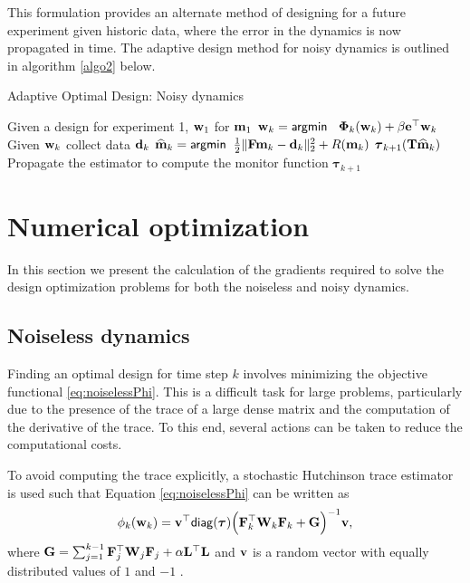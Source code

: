 \documentclass[english]{siamltex}
\newcommand{\bfF}	{{\bf{F}}}
\newcommand{\bfG}	{{\bf{G}}}
\newcommand{\bfL}	{{\bf{L}}}
\newcommand{\bfQ}	{{\bf{Q}}}
\newcommand{\bfT}	{{\bf{T}}}
\newcommand{\bfW}	{{\bf{W}}}
\newcommand{\bfd}	{{\bf{d}}}
\newcommand{\bfe}	{{\bf{e}}}
\newcommand{\bfm}	{{\bf{m}}}
\newcommand{\bfv}	{{\bf{v}}}
\newcommand{\bfw}	{{\bf{w}}}
\newcommand{\hf}        {{\frac 12}}
\newcommand{\bfPhi}     {{\boldsymbol \Phi}}
\newcommand{\bftau}      {{\boldsymbol \tau}}
\newcommand{\bfmhat}    {{\widehat{\bfm}}}
\newcommand{\LtL}       { \bfL^{\top}\bfL}
\renewcommand{\hf}		 {\frac12}
\renewcommand{\bfmhat}	{\widehat{\bf m}}
\begin{document}
{This formulation provides an alternate method of designing for a future experiment given historic data, where the error in the dynamics is now propagated in time. 
The adaptive design method for noisy dynamics is outlined in  algorithm \ref{algo2} below.
\begin{algorithm}
\caption{Adaptive Optimal Design: Noisy dynamics}\label{algo2}
\begin{algorithmic}[1]
\State Given a design for experiment 1, $\bfw_1$  for $\bfm_1$
\State $\bfw_{k} = {\sf argmin }\;\;\ \bfPhi_k(\bfw_k) + \beta\bfe^{\top}\bfw_k$  
\State Given $\bfw_k$ collect data $\bfd_k$
%
\State $\bfmhat_{k} = {\sf argmin } \;\; \hf  \| \bfF\bfm_k - \bfd_k \|^2_2 + R(\bfm_k)$
\Comment {estimate $\bfm_k$ }
\State $\bftau_{k+1}(\bfT\bfmhat_{k})$
\Comment Propagate the estimator to compute the monitor function $\bftau_{k+1}$
\EndFor
\end{algorithmic}
\end{algorithm}
\section{Numerical optimization}
In this section we present the calculation of the gradients required to solve the design optimization problems for both the noiseless and noisy dynamics. 
\label{sec:Opt}
\subsection{Noiseless dynamics}
Finding an optimal design for  time step $k$ involves minimizing the objective functional \eqref{eq:noiselessPhi}. 
This is a difficult task for large problems, particularly due to the presence of the trace of a large dense matrix and the computation of the derivative of the trace. To this end, several actions can be taken to reduce the computational costs.

To avoid computing the trace explicitly, a stochastic Hutchinson trace estimator  is used  such that Equation \eqref{eq:noiselessPhi} can be written as
\begin{equation*}
\phi_k(\bfw_k) = \bfv^{\top}{\sf diag}(\bftau) \Big(\bfF_k^{\top}\bfW_k\bfF_k   + \bfG \Big)^{-1}\bfv,
\end{equation*}
where $\bfG = \sum_{j=1}^{k-1}\bfF_{j}^{\top}\bfW_{j}\bfF_{j}+ \alpha\LtL$ and $\bfv$ is a random vector with equally distributed values of $1$ and $-1$ \cite{Hutchinson1989}. 


}
\end{document}
